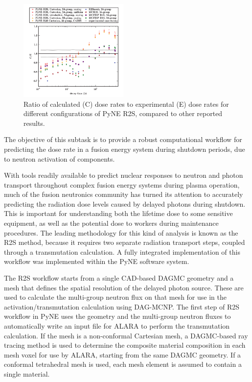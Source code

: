 \begin{figure}
\centering
\includegraphics[width=0.48\textwidth]{imgs/r2s-validation.png}
\caption{\label{fig:r2s-validation}Ratio of calculated (C) dose rates to
  experimental (E) dose rates for different configurations of PyNE R2S,
  compared to other reported results.}
\end{figure}

The objective of this subtask is to provide a robust computational workflow
for predicting the dose rate in a fusion energy system during shutdown
periods, due to neutron activation of components.

With tools readily available to predict nuclear responses to neutron and photon
transport throughout complex fusion energy systems during plasma operation,
much of the fusion neutronics community has turned its attention to accurately
predicting the radiation dose levels caused by delayed photons during
shutdown.  This is important for understanding both the lifetime dose to some
sensitive equipment, as well as the potential dose to workers during
maintenance procedures.  The leading methodology for this kind of analysis is
known as the \gls{R2S} method, because it requires two separate radiation
transport steps, coupled through a transmutation
calculation\cite{various_r2s}.  A fully integrated implementation of this
workflow was implemented within the PyNE software system\cite{pyne}.

The \gls{R2S} workflow starts from a single CAD-based \gls{DAGMC} geometry and
a mesh that defines the spatial resolution of the delayed photon source.
These are used to calculate the multi-group neutron flux on that mesh for use
in the activation/transmutation calculation using DAG-MCNP.  The first step of
\gls{R2S} workflow in PyNE uses the geometry and the multi-group neutron
fluxes to automatically write an input file for ALARA to perform the
transmutation calculation.  If the mesh is a non-conformal Cartesian mesh, a
\gls{DAGMC}-based ray tracing method is used to determine the composite
material composition in each mesh voxel for use by ALARA, starting from the
same \gls{DAGMC} geometry.  If a conformal tetrahedral mesh is used, each mesh
element is assumed to contain a single material.

